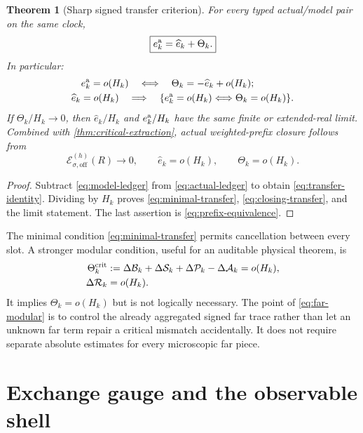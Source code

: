 \documentclass[11pt]{article}
\newtheorem{theorem}{Theorem}[section]
\theoremstyle{remark}
\newcommand{\cA}{\mathcal A}
\newcommand{\cB}{\mathcal B}
\newcommand{\cE}{\mathcal E}
\newcommand{\cP}{\mathcal P}
\newcommand{\cR}{\mathcal R}
\newcommand{\cS}{\mathcal S}
\newcommand{\wh}[1]{\widehat{#1}}
\begin{document}
\begin{theorem}[Sharp signed transfer criterion]
\label{thm:transfer}
For every typed actual/model pair on the same clock,
\begin{equation}
 \boxed{e_k^{\rm a}=\wh e_k+\Theta_k.}
 \label{eq:transfer-identity}
\end{equation}
In particular:
\begin{align}
 e_k^{\rm a}=o(H_k)
 &\quad\Longleftrightarrow\quad
 \Theta_k=-\wh e_k+o(H_k);
 \label{eq:minimal-transfer}\\
 \wh e_k=o(H_k)
 \quad&\Longrightarrow\quad
 \{e_k^{\rm a}=o(H_k)\Longleftrightarrow\Theta_k=o(H_k)\}.
 \label{eq:closing-transfer}
\end{align}
If $\Theta_k/H_k\to0$, then $\wh e_k/H_k$ and $e_k^{\rm a}/H_k$
have the same finite or extended-real limit.  Combined with
\cref{thm:critical-extraction}, actual weighted-prefix closure follows from
\begin{equation}
 \cE_{\sigma,\mathrm{off}}^{(h)}(R)\to0,
 \qquad
 \wh e_k=o(H_k),
 \qquad
 \Theta_k=o(H_k).
 \label{eq:full-constituent-sufficient}
\end{equation}
\end{theorem}

\begin{proof}
Subtract \eqref{eq:model-ledger} from \eqref{eq:actual-ledger} to obtain
\eqref{eq:transfer-identity}.  Dividing by $H_k$ proves
\eqref{eq:minimal-transfer}, \eqref{eq:closing-transfer}, and the limit
statement.  The last assertion is \eqref{eq:prefix-equivalence}.
\end{proof}

The minimal condition \eqref{eq:minimal-transfer} permits cancellation
between every slot.  A stronger modular condition, useful for an auditable
physical theorem, is
\begin{align}
 \Theta_k^{\rm crit}
 &:=\Delta\cB_k+\Delta\cS_k+\Delta\cP_k-\Delta\cA_k
 =o(H_k),
 \label{eq:critical-modular}\\
 \Delta\cR_k&=o(H_k).
 \label{eq:far-modular}
\end{align}
It implies $\Theta_k=o(H_k)$ but is not logically necessary.  The point of
\eqref{eq:far-modular} is to control the already aggregated signed far trace
rather than let an unknown far term repair a critical mismatch accidentally.
It does not require separate absolute estimates for every microscopic far
piece.

\section{Exchange gauge and the observable shell}
\end{document}
